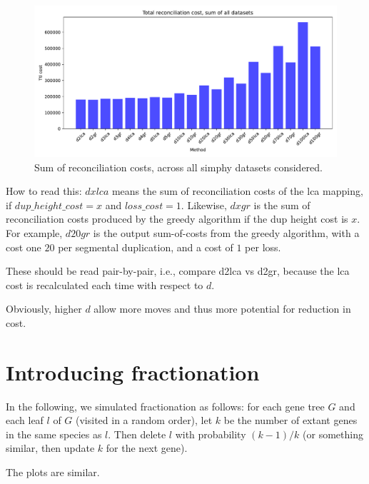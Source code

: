\documentclass{article}
\begin{document}
\clearpage 



\begin{figure}[H]
    \centering
    \includegraphics[width=\textwidth]{plots/costs.pdf}
    \caption{Sum of reconciliation costs, across all simphy datasets considered.  }
    \label{fig:enter-label}
\end{figure}


How to read this: $dxlca$ means the sum of reconciliation costs of the lca mapping, if $dup\_height\_cost=x$ and $loss\_cost = 1$.  Likewise, $dxgr$ is the sum of reconciliation costs produced by the greedy algorithm if the dup height cost is $x$.  For example, $d20gr$ is the output sum-of-costs from the greedy algorithm, with a cost one $20$ per segmental duplication, and a cost of $1$ per loss.

These should be read pair-by-pair, i.e., compare d2lca vs d2gr, because the lca cost is recalculated each time with respect to $d$.

Obviously, higher $d$ allow more moves and thus more potential for reduction in cost.


\clearpage 


\section*{Introducing fractionation}

In the following, we simulated fractionation as follows: for each gene tree $G$ and each leaf $l$ of $G$ (visited in a random order), let $k$ be the number of extant genes in the same species as $l$.  Then delete $l$ with probability $(k-1)/k$ (or something similar, then update $k$ for the next gene). 

The plots are similar.
\end{document}
